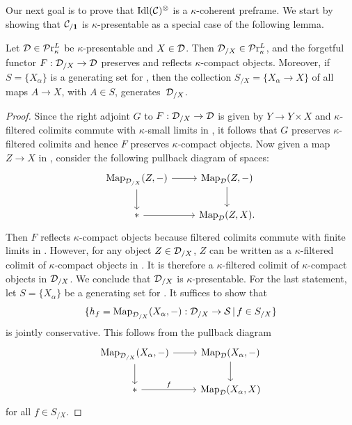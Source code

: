 \documentclass[10pt,a4paper,oneside]{article}
\begin{document}

\begin{rem}
Our next goal is to prove that $\operatorname{Idl}(\mathcal{C})^\otimes$ is a $\kappa$-coherent preframe. We start by showing that $\mathcal{C}_{/\mathbf{1}}$ is $\kappa$-presentable as a special case of the following lemma.
\end{rem}

\begin{lem}\label{overcataccessible}
Let $\mathcal{D}\in\mathcal{P}\mathrm{r}^L_{\kappa}$ be $\kappa$-presentable \infcat and $X\in\mathcal{D}$. Then $\mathcal{D}_{/X}\in\mathcal{P}\mathrm{r}^L_{\kappa}$, and the forgetful functor $F:\mathcal{D}_{/X}\to \mathcal{D}$ preserves and reflects $\kappa$-compact objects. Moreover, if $S=\{X_\alpha\}$ is a generating set %
for \mcd, then the collection $S_{/X}=\{X_\alpha\to X\}$ of all maps $A\to X$, with $A\in S$, generates~$\mathcal{D}_{/X}$.
\end{lem}

\begin{proof}
Since the right adjoint $G$ to $F:\mathcal{D}_{/X}\to \mathcal{D}$ is given by $Y\to Y\times X$ and $\kappa$-filtered colimits commute with $\kappa$-small limits in \mcd, it follows that $G$ preserves $\kappa$-filtered colimits and hence $F$ preserves $\kappa$-compact objects. Now given a map $Z\to X$ in \mcd, consider the following pullback diagram of spaces:
$$
\begin{tikzcd}
{\mapp_{\mcd_{/X}}(Z,-)} \arrow[d] \arrow[r] & {\mapp_{\mcd}(Z,-)} \arrow[d] \\
* \arrow[r]                                  & {\mapp_{\mcd}(Z,X)}.       
\end{tikzcd}$$
Then $F$ reflects $\kappa$-compact objects because filtered colimits commute with finite limits in \mcs. However, for any object $Z\in \mathcal{D}_{/X}$, $Z$ can be written as a $\kappa$-filtered colimit of $\kappa$-compact objects in \mcd. It is therefore a $\kappa$-filtered colimit of $\kappa$-compact objects in $\mathcal{D}_{/X}$. We conclude that $\mathcal{D}_{/X}$ is $\kappa$-presentable. For the last statement, let $S=\{X_\alpha\}$ be a generating set %
for \mcd. It suffices to show that $$\{h_f=\operatorname{Map}_{\mathcal{D}_{/X}}(X_\alpha,-): \mathcal{D}_{/X}\to\mathcal{S} \,|\,f\in S_{/X} \}$$ is jointly conservative. This follows from the pullback diagram
$$
\begin{tikzcd}
{\mapp_{\mcd_{/X}}(X_\alpha,-)} \arrow[d] \arrow[r] & {\mapp_{\mcd}(X_\alpha,-)} \arrow[d] \\
* \arrow[r,"f"]                                  & {\mapp_{\mcd}(X_\alpha,X)}   
\end{tikzcd}$$
for all $f\in S_{/X}$.
\end{proof}
\end{document}
